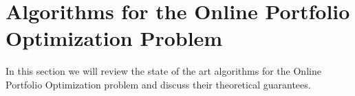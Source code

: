 \chapter{Algorithms for the Online Portfolio Optimization Problem}

In this section we will review the state of the art algorithms for the Online Portfolio Optimization problem and discuss their theoretical guarantees.

